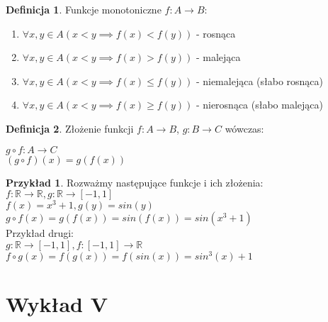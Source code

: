 \documentclass{article}
\theoremstyle{definition}
\newtheorem{de}{Definicja}[subsection]
\theoremstyle{definition}
\theoremstyle{definition}
\newtheorem{pk}{Przykład}[subsection]
\theoremstyle{definition}
\begin{document}
\begin{de}
    Funkcje monotoniczne $f: A\rightarrow B$:
    \begin{enumerate}
        \item $\forall{x,y\in A} (x<y \implies f(x)<f(y))$ - rosnąca
        \item $\forall{x,y\in A} (x<y \implies f(x)>f(y))$ - malejąca
        \item $\forall{x,y\in A} (x<y \implies f(x)\leq f(y))$ - niemalejąca (słabo rosnąca)
        \item $\forall{x,y\in A} (x<y \implies f(x)\geq f(y))$ - nierosnąca (słabo malejąca)
    \end{enumerate}
\end{de}

\begin{de}
    Złożenie funkcji $f: A\rightarrow B$, $g: B\rightarrow C$ wówczas:
    \begin{center}
    $g\circ f: A\rightarrow C$\\
    $(g\circ f)(x)=g(f(x))$
    \end{center}
\end{de}

\begin{pk}
    Rozważmy następujące funkcje i ich złożenia:\\
    $f: \mathbb{R}\rightarrow\mathbb{R}, g: \mathbb{R}\rightarrow[-1,1]$\\
    $f(x) = x^3 + 1, g(y) = sin(y)$\\
    $g\circ f(x) = g(f(x)) = sin(f(x)) = sin(x^3+1)$\\
    Przykład drugi:\\
    $g: \mathbb{R}\rightarrow[-1,1], f: [-1,1]\rightarrow\mathbb{R}$\\
    $f\circ g(x) = f(g(x)) = f(sin(x)) = sin^3(x)+1$
\end{pk}

\section{Wykład V}
\end{document}
